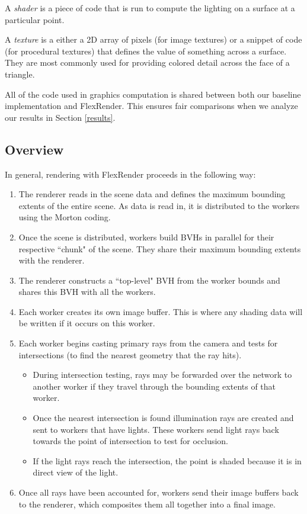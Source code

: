 \documentclass[12pt]{ucthesis}
\begin{document}
A \emph{shader} is a piece of code that is run to compute the lighting on a
surface at a particular point.

A \emph{texture} is a either a 2D array of pixels (for image textures) or
a snippet of code (for procedural textures) that defines the value of
something across a surface. They are most commonly used for providing colored
detail across the face of a triangle.

All of the code used in graphics computation is shared between both our baseline
implementation and FlexRender. This ensures fair comparisons when we analyze our
results in Section \ref{results}.

\subsection{Overview}
\label{overview}

In general, rendering with FlexRender proceeds in the following way:

\begin{enumerate}
    \item The renderer reads in the scene data and defines the maximum bounding
        extents of the entire scene. As data is read in, it is distributed to
        the workers using the Morton coding.
    \item Once the scene is distributed, workers build BVHs in parallel for
        their respective ``chunk" of the scene. They share their maximum bounding
        extents with the renderer.
    \item The renderer constructs a ``top-level" BVH from the worker bounds and
        shares this BVH with all the workers.
    \item Each worker creates its own image buffer. This is where any shading
        data will be written if it occurs on this worker.
    \item Each worker begins casting primary rays from the camera and tests for
        intersections (to find the nearest geometry that the ray hits).
        \begin{itemize}
            \item During intersection testing, rays may be forwarded over the
                network to another worker if they travel through the bounding
                extents of that worker.
            \item Once the nearest intersection is found illumination rays are
                created and sent to workers that have lights. These workers
                send light rays back towards the point of intersection to test
                for occlusion.
            \item If the light rays reach the intersection, the point is shaded
                because it is in direct view of the light.
        \end{itemize}
    \item Once all rays have been accounted for, workers send their image
        buffers back to the renderer, which composites them all together into
        a final image.
\end{enumerate}
\end{document}
